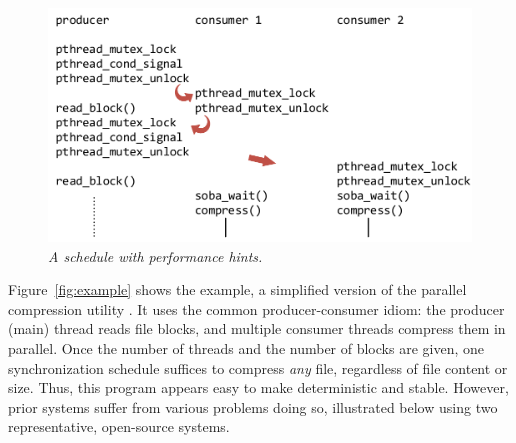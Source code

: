 \begin{figure}[t]
\centering
\includegraphics[width=\columnwidth]{parrot/figures/parrot_schedule}
\vspace{-.2in}
\caption{{\em A \parrot schedule with performance
    hints.}}\label{fig:parrot-schedule}
\vspace{-.05in}
\end{figure}


Figure~\ref{fig:example} shows the example, a simplified version of the parallel
compression utility \pbzip\cite{pbzip2}.  It uses the common producer-consumer idiom:
the producer (main) thread reads file blocks, and multiple consumer
threads compress them in parallel.  Once the number of threads and the
number of blocks are given, one synchronization schedule suffices to
compress \emph{any} file, regardless of file content or size.  Thus, this program appears
easy to make deterministic and stable.  However, prior systems suffer from
various problems doing so, illustrated below using
two representative, open-source systems.


